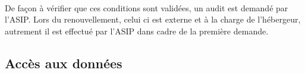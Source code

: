 \paragraph{}
De façon à vérifier que ces conditions sont validées, un audit est demandé par
l'ASIP\@. Lors du renouvellement, celui ci est externe et à la charge de
l'hébergeur, autrement il est effectué par l'ASIP dans cadre de la première
demande.

        \subsection{Accès aux données}
